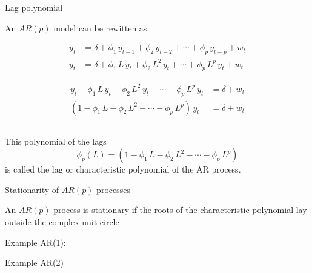 \documentclass[11pt,ignorenonframetext,]{beamer}
\begin{document}
\begin{frame}[t]{Lag polynomial}

An \(AR(p)\) model can be rewitten as

\[
\begin{aligned}
y_t &= \delta + \phi_1 \, y_{t-1} + \phi_2 \, y_{t-2} + \cdots + \phi_p \, y_{t-p} + w_t  \\
y_t &= \delta + \phi_1 \, L \, y_t + \phi_2 \, L^2 \, y_t + \cdots + \phi_p \, L^p \, y_t + w_t
\end{aligned}
\]

\[
\begin{aligned}
y_t - \phi_1 \, L \, y_t - \phi_2 \, L^2 \, y_t - \cdots - \phi_p \, L^p \, y_t &= \delta + w_t \\
(1 - \phi_1 \, L - \phi_2 \, L^2 - \cdots - \phi_p \, L^p) \, y_t &= \delta + w_t
\end{aligned}
\]

\pause

\[~\]

This polynomial of the lags
\[\phi_p(L) = (1 - \phi_1 \, L - \phi_2 \, L^2 - \cdots - \phi_p \, L^p)\]
is called the lag or characteristic polynomial of the AR process.

\end{frame}

\begin{frame}[t]{Stationarity of \(AR(p)\) processes}

An \(AR(p)\) process is stationary if the roots of the characteristic
polynomial lay outside the complex unit circle

\pause

Example AR(1):

\end{frame}

\begin{frame}{Example AR(2)}

\end{frame}
\end{document}
